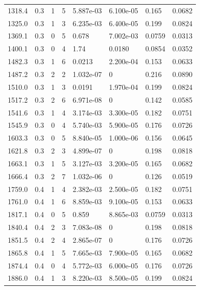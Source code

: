 \documentclass[preview]{standalone}
\begin{document}
{{{\begin{tabular}{L{1.2cm}C{1.2cm} C{0.3cm}C{0.5cm} C{1.4cm}C{1.4cm} C{1.4cm}C{1.4cm}}
  1318.4  &   0.3  & 1     &  5 &  5.887e-03  & 6.100e-05  & 0.165 &  0.0682   \\ 
  1325.0  &   0.3  & 1     &  3 &  6.235e-03  & 6.400e-05  & 0.199 &  0.0824   \\ 
  1369.1  &   0.3  & 0     &  5 &  0.678  & 7.002e-03  & 0.0759 &  0.0313   \\ 
  1400.1  &   0.3  & 0     &  4 &  1.74  & 0.0180  & 0.0854 &  0.0352   \\ 
  1482.3  &   0.3  & 1     &  6 &  0.0213  & 2.200e-04  & 0.153 &  0.0633   \\ 
  1487.2  &   0.3  & 2     &  2 &  1.032e-07  & 0  & 0.216 &  0.0890   \\ 
  1510.0  &   0.3  & 1     &  3 &  0.0191  & 1.970e-04  & 0.199 &  0.0824   \\ 
  1517.2  &   0.3  & 2     &  6 &  6.971e-08  & 0  & 0.142 &  0.0585   \\ 
  1541.6  &   0.3  & 1     &  4 &  3.174e-03  & 3.300e-05  & 0.182 &  0.0751   \\ 
  1545.9  &   0.3  & 0     &  4 &  5.740e-03  & 5.900e-05  & 0.176 &  0.0726   \\ 
  1603.3  &   0.3  & 0     &  5 &  8.840e-05  & 1.000e-06  & 0.156 &  0.0645   \\ 
  1621.8  &   0.3  & 2     &  3 &  4.899e-07  & 0  & 0.198 &  0.0818   \\ 
  1663.1  &   0.3  & 1     &  5 &  3.127e-03  & 3.200e-05  & 0.165 &  0.0682   \\ 
  1666.4  &   0.3  & 2     &  7 &  1.032e-06  & 0  & 0.126 &  0.0519   \\ 
  1759.0  &   0.4  & 1     &  4 &  2.382e-03  & 2.500e-05  & 0.182 &  0.0751   \\ 
  1761.0  &   0.4  & 1     &  6 &  8.859e-03  & 9.100e-05  & 0.153 &  0.0633   \\ 
  1817.1  &   0.4  & 0     &  5 &  0.859  & 8.865e-03  & 0.0759 &  0.0313   \\ 
  1840.4  &   0.4  & 2     &  3 &  7.083e-08  & 0  & 0.198 &  0.0818   \\ 
  1851.5  &   0.4  & 2     &  4 &  2.865e-07  & 0  & 0.176 &  0.0726   \\ 
  1865.8  &   0.4  & 1     &  5 &  7.665e-03  & 7.900e-05  & 0.165 &  0.0682   \\ 
  1874.4  &   0.4  & 0     &  4 &  5.772e-03  & 6.000e-05  & 0.176 &  0.0726   \\ 
  1886.0  &   0.4  & 1     &  3 &  8.220e-03  & 8.500e-05  & 0.199 &  0.0824   \\ 

\end{tabular}}}}
\end{document}
